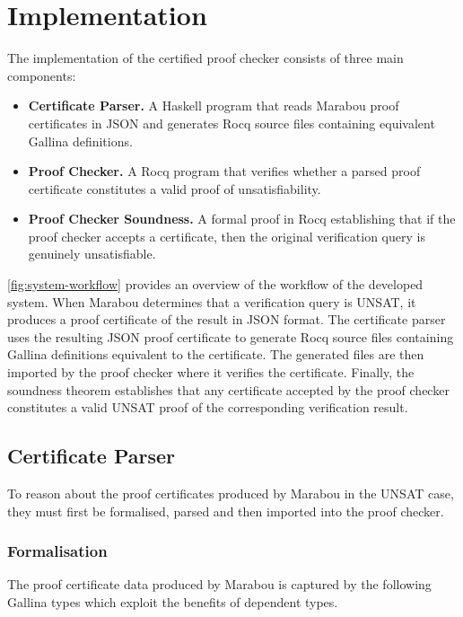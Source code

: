 \section{Implementation} \label{sec:implementation}

The implementation of the certified proof checker consists of three main components:
\begin{itemize}
    \item \textbf{Certificate Parser.} A Haskell program that reads Marabou proof certificates in JSON and generates Rocq source files containing equivalent Gallina definitions.
    \item \textbf{Proof Checker.} A Rocq program that verifies whether a parsed proof certificate constitutes a valid proof of unsatisfiability.
    \item \textbf{Proof Checker Soundness.} A formal proof in Rocq establishing that if the proof checker accepts a certificate, then the original verification query is genuinely unsatisfiable.
\end{itemize}

\autoref{fig:system-workflow} provides an overview of the workflow of the developed system. When Marabou determines that a verification query is UNSAT, it produces a proof certificate of the result in JSON format. The certificate parser uses the resulting JSON proof certificate to generate Rocq source files containing Gallina definitions equivalent to the certificate. The generated files are then imported by the proof checker where it verifies the certificate. Finally, the soundness theorem establishes that any certificate accepted by the proof checker constitutes a valid UNSAT proof of the corresponding verification result.



\subsection{Certificate Parser}
To reason about the proof certificates produced by Marabou in the UNSAT case, they must first be formalised, parsed and then imported into the proof checker.

\subsubsection{Formalisation}
The proof certificate data produced by Marabou is captured by the following Gallina types which exploit the benefits of dependent types.

